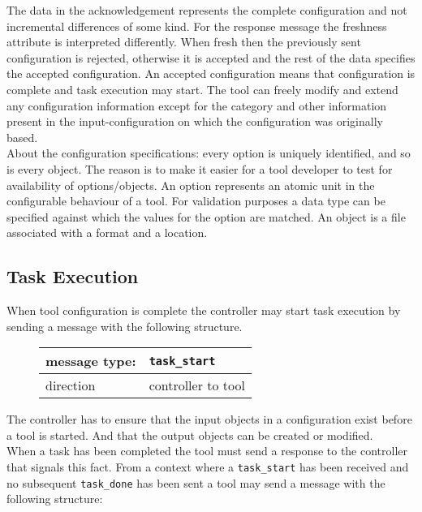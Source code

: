 \documentclass{article}
\newcommand{\msg}[1]{\texttt{#1}}
\begin{document}
   \noindent The data in the acknowledgement represents the complete
   configuration and not incremental differences of some kind. For the response
   message the freshness attribute is interpreted differently.  When fresh then
   the previously sent configuration is rejected, otherwise it is accepted and
   the rest of the data specifies the accepted configuration.  An accepted
   configuration means that configuration is complete and task execution may
   start.  The tool can freely modify and extend any configuration information
   except for the category and other information present in the
   input-configuration on which the configuration was originally based.
   \\[4pt]
   \noindent About the configuration specifications: every option is uniquely
   identified, and so is every object. The reason is to make it easier for a
   tool developer to test for availability of options/objects.  An option
   represents an atomic unit in the configurable behaviour of a tool. For
   validation purposes a data type can be specified against which the values
   for the option are matched. An object is a file associated with a format and
   a location.

  \subsection{Task Execution}

   \noindent When tool configuration is complete the controller may start task
   execution by sending a message with the following structure.

   \begin{figure}[H]
    \begin{tabular}{|ll|}
     \hline
      message type:   & \msg{task\_start} \\
     \hline
      direction       & controller to tool \\
     \hline
    \end{tabular}
   \end{figure}

   \noindent The controller has to ensure that the input objects in a
   configuration exist before a tool is started. And that the output objects
   can be created or modified.
   \\[4pt]
   When a task has been completed the tool must send a response to the
   controller that signals this fact. From a context where a \msg{task\_start}
   has been received and no subsequent \msg{task\_done} has been sent a tool
   may send a message with the following structure:
\end{document}
